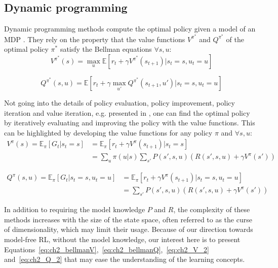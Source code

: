 \subsection{Dynamic programming}
Dynamic programming \citep{bellman1966dynamic} methods compute the optimal policy given a model of an MDP \citep{sutton2018reinforcement}.
They rely on the property that the value functions $V^{\pi^*}$ and $Q^{\pi^*}$ of the optimal policy ${\pi^*}$ satisfy the Bellman equations $\forall s, u$:
\begin{equation}
\label{eq:ch2_bellmanV}
    V^{\pi^*}(s) = \max_u \mathbb{E}[r_t + \gamma V^{\pi^*}(s_{t+1})| s_t=s, u_t=u]
\end{equation}

\begin{equation}
\label{eq:ch2_bellmanQ}
    Q^{\pi^*}(s, u) = \mathbb{E}[r_t + \gamma \max_{u'} Q^{\pi^*}(s_{t+1}, u') |s_t=s, u_t=u]
\end{equation}

Not going into the details of policy evaluation, policy improvement, policy iteration and value iteration, e.g. presented in \citep{sutton2018reinforcement}, one can find the optimal policy by iteratively evaluating and improving the policy with the value functions.
This can be highlighted by developing the value functions for any policy $\pi$ and $\forall s, u$:
\begin{equation}
\label{eq:ch2_V_2}
\begin{split}
    V^\pi(s)= \mathbb{E}_{\pi}\left[G_t|s_t=s\right] & = \mathbb{E}_{\pi}\left[r_t + \gamma V^\pi(s_{t+1})|s_t=s\right]\\
     & = \sum_{u} \pi(u|s) \sum_{s'} P(s', s, u) (R(s', s, u) + \gamma V^\pi(s'))
\end{split}
\end{equation}

\begin{equation}
\label{eq:ch2_Q_2}
\begin{split}
    Q^\pi(s, u) = \mathbb{E}_{\pi}\left[G_t|s_t=s, u_t=u\right] & = \mathbb{E}_{\pi}\left[r_t + \gamma V^\pi(s_{t+1})|s_t=s, u_t=u \right] \\
    &  = \sum_{s'} P(s', s, u) (R(s', s, u) + \gamma V^\pi(s'))
\end{split}
\end{equation}

In addition to requiring the model knowledge $P$ and $R$, the complexity of these methods increases with the size of the state space, often referred to as the curse of dimensionality, which may limit their usage.
Because of our direction towards model-free RL, without the model knowledge, our interest here is to present Equations~\ref{eq:ch2_bellmanV},~\ref{eq:ch2_bellmanQ},~\ref{eq:ch2_V_2} and~\ref{eq:ch2_Q_2} that may ease the understanding of the learning concepts.


